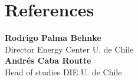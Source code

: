 \section{References \faUsers}
\textbf{Rodrigo Palma Behnke}\\
Director Energy Center U. de Chile\\
\sectionsep
\textbf{Andrés Caba Routte}\\
Head of studies DIE U. de Chile\\
